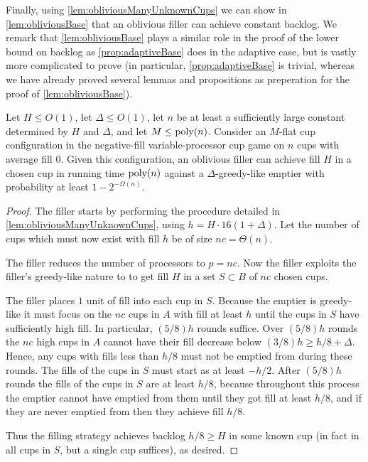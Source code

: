 Finally, using \cref{lem:obliviousManyUnknownCups} we can show in
\cref{lem:obliviousBase} that an oblivious filler can achieve
constant backlog. We remark that \cref{lem:obliviousBase} plays a
similar role in the proof of the lower bound on backlog as
\cref{prop:adaptiveBase} does in the adaptive case, but is vastly
more complicated to prove (in particular,
\cref{prop:adaptiveBase} is trivial, whereas we have already
proved several lemmas and propositions as preperation for the
proof of \cref{lem:obliviousBase}).
\begin{lemma}
  \label{lem:obliviousBase}
  Let $H \le O(1)$, let $\Delta \le O(1)$, let $n$ be at
  least a sufficiently large constant determined by $H$ and
  $\Delta$, and let $M \le \operatorname{\text{poly}}(n)$. 
  Consider an $M$-flat cup configuration in the negative-fill variable-processor cup
  game on $n$ cups with average fill $0$.
  Given this configuration, an oblivious filler can achieve fill $H$
  in a chosen cup in running time $\operatorname{\text{poly}}(n)$ against a
  $\Delta$-greedy-like emptier with probability at least $1-2^{-\Omega(n)}.$
\end{lemma}
\begin{proof}
  The filler starts by performing the procedure detailed in
  \ref{lem:obliviousManyUnknownCups}, using $h = H\cdot
  16(1+\Delta)$. Let the number of cups which must now exist with
  fill $h$ be of size $nc = \Theta(n)$.

  The filler reduces the number of processors to $p=nc$. 
  Now the filler exploits the filler's greedy-like nature to
  to get fill $H$ in a set $S\subset B$ of $nc$ chosen cups.

  The filler places $1$ unit of fill into each cup in $S$.
  Because the emptier is greedy-like it must focus on the $nc$
  cups in $A$ with fill at least $h$ until the cups in $S$ have
  sufficiently high fill. In particular, $(5/8)h$ rounds suffice.
  Over $(5/8)h$ rounds the $nc$ high cups in $A$ cannot have
  their fill decrease below $(3/8)h \ge h/8 + \Delta$. Hence, any
  cups with fills less than $h/8$ must not be emptied from during
  these rounds. The fills of the cups in $S$ must start
  as at least $-h/2$. After $(5/8)h$ rounds the fills of the cups
  in $S$ are at least $h/8$, because throughout this process the
  emptier cannot have emptied from them until they got fill at
  least $h/8$, and if they are never emptied from then they
  achieve fill $h/8$.

  Thus the filling strategy achieves backlog $h/8 \ge H$ in some
  known cup (in fact in all cups in $S$, but a single cup
  suffices), as desired.

\end{proof}

